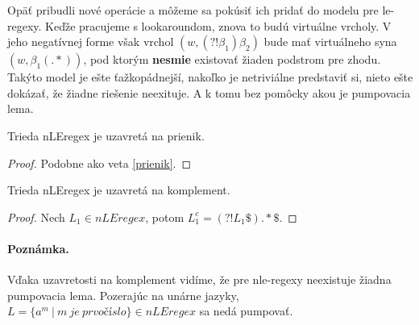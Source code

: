 Opäť pribudli nové operácie a môžeme sa pokúsiť ich pridať do modelu pre le-regexy. Keďže pracujeme s lookaroundom, znova to budú virtuálne vrcholy. V jeho negatívnej forme však vrchol $(w,(?!\beta_1)\beta_2)$ bude mať virtuálneho syna $(w, \beta_1(.*))$, pod ktorým \textbf{nesmie} existovať žiaden podstrom pre zhodu. Takýto model je ešte ťažkopádnejší, nakoľko je netriviálne predstaviť si, nieto ešte dokázať, že žiadne riešenie neexituje. A k tomu bez pomôcky akou je pumpovacia lema.

\begin{veta}
Trieda nLEregex je uzavretá na prienik.
\end{veta}
\begin{proof}
Podobne ako veta \ref{prienik}.
\end{proof}

\begin{veta}
Trieda nLEregex je uzavretá na komplement.
\end{veta}
\begin{proof}
Nech $L_1 \in nLEregex$, potom $L_1^c  = \left( ?! L_1 \mathdollar \right) .* \mathdollar $.
\end{proof}

\paragraph{Poznámka.}
Vďaka uzavretosti na komplement vidíme, že pre nle-regexy neexistuje žiadna pumpovacia lema. Pozerajúc na unárne jazyky, $L = \lbrace a^m ~|~ m~je~prvočíslo\rbrace \in nLEregex$ sa nedá pumpovať.
